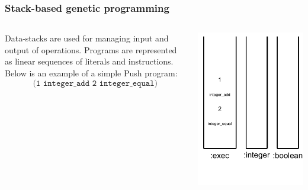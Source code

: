 \documentclass{beamer}
\newcommand{\linespace}{\vskip 0.25cm}
\begin{document}
\begin{frame}
	\frametitle{Stack-based genetic programming}
	\begin{columns}
		\begin{column}{0.65\textwidth}
			Data-stacks are used for managing input and output of operations.
			\linespace
			\linespace
			\linespace
			Programs are represented as linear sequences of literals and instructions. Below is an example of a simple Push program:
			\[\texttt{(1 integer\_add 2 integer\_equal)}\]
		\end{column}
		\begin{column}{0.35\textwidth}
			\includegraphics[height=.7\textheight]{Illustrations/stack_1.PDF}
		\end{column}
	\end{columns}
\end{frame}
\end{document}
